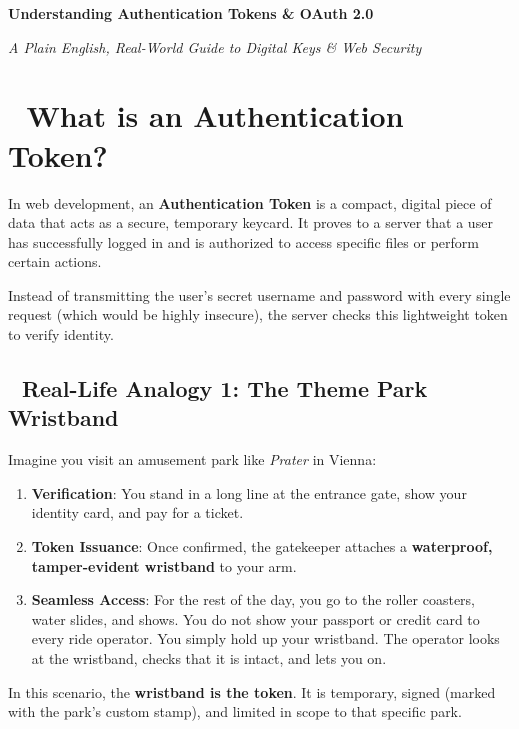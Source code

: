\documentclass[11pt,a4paper]{article}
\begin{document}
\begin{tcolorbox}[
    colback=primaryblue,
    colframe=primaryblue,
    arc=6pt,
    left=15pt,
    right=15pt,
    top=20pt,
    bottom=20pt,
    coltext=white
]
    \centering
    {\huge\bfseries Understanding Authentication Tokens \& OAuth 2.0 \par}
    \vspace{8pt}
    {\large\itshape A Plain English, Real-World Guide to Digital Keys \& Web Security \par}
\end{tcolorbox}

\vspace{15pt}

\section{🔑 What is an Authentication Token?}
In web development, an \textbf{Authentication Token} is a compact, digital piece of data that acts as a secure, temporary keycard. It proves to a server that a user has successfully logged in and is authorized to access specific files or perform certain actions.

Instead of transmitting the user's secret username and password with every single request (which would be highly insecure), the server checks this lightweight token to verify identity.

\subsection{🚗 Real-Life Analogy 1: The Theme Park Wristband}
Imagine you visit an amusement park like \textit{Prater} in Vienna:
\begin{enumerate}
    \item \textbf{Verification}: You stand in a long line at the entrance gate, show your identity card, and pay for a ticket.
    \item \textbf{Token Issuance}: Once confirmed, the gatekeeper attaches a \textbf{waterproof, tamper-evident wristband} to your arm.
    \item \textbf{Seamless Access}: For the rest of the day, you go to the roller coasters, water slides, and shows. You do not show your passport or credit card to every ride operator. You simply hold up your wristband. The operator looks at the wristband, checks that it is intact, and lets you on.
\end{enumerate}
In this scenario, the \textbf{wristband is the token}. It is temporary, signed (marked with the park's custom stamp), and limited in scope to that specific park.
\end{document}
